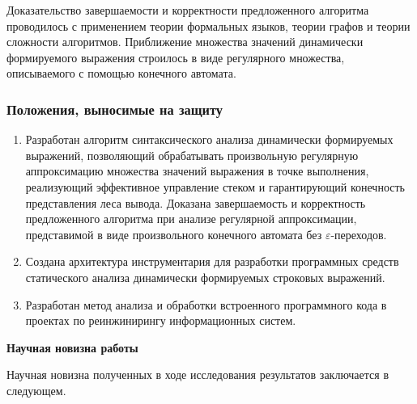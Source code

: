 Доказательство завершаемости и корректности предложенного алгоритма проводилось с применением теории формальных языков, теории графов и теории сложности алгоритмов. Приближение множества значений динамически формируемого выражения строилось в виде регулярного множества, описываемого с помощью конечного автомата.


\subsubsection*{\large{Положения, выносимые на защиту}}
\begin{enumerate}
    \item Разработан алгоритм синтаксического анализа динамически формируемых выражений, позволяющий обрабатывать произвольную регулярную аппроксимацию множества значений выражения в точке выполнения, реализующий 
    эффективное управление стеком и гарантирующий конечность представления леса вывода. Доказана завершаемость и корректность предложенного алгоритма при анализе регулярной аппроксимации, представимой в виде произвольного конечного автомата без $\varepsilon$-переходов. 
    \item Создана архитектура инструментария для разработки программных средств статического анализа динамически формируемых строковых выражений.
    \item Разработан метод анализа и обработки встроенного программного кода в проектах по реинжинирингу информационных систем. 
\end{enumerate}



\textbf{Научная новизна работы}

Научная новизна полученных в ходе исследования результатов заключается в следующем.

